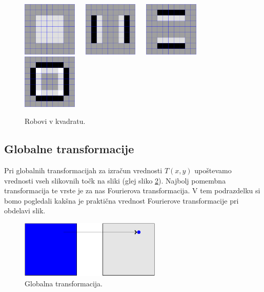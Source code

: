 %
\begin{figure}[htbp]
  \centering
  \includegraphics[width=0.23\textwidth]{./slike-latex/rob-kvadrat}\ \ \ 
  \includegraphics[width=0.23\textwidth]{./slike-latex/rob-kvadrat-vodoravno}\ \ \  
  \includegraphics[width=0.23\textwidth]{./slike-latex/rob-kvadrat-navpicno}\ \ \ 
  \includegraphics[width=0.23\textwidth]{./slike-latex/rob-kvadrat-vod-nav}
  \caption{Robovi v kvadratu.}
  \label{fig:roboviKvadrat}
\end{figure}
%
\subsection{Globalne transformacije}
Pri globalnih transformacijah za izračun vrednosti $T(x, y)$ upoštevamo vrednosti vseh slikovnih točk na sliki (glej sliko \ref{fig:globalnaT}). Najbolj pomembna transformacija te vrste je za nas Fourierova transformacija. V tem podrazdelku si bomo pogledali kakšna je praktična vrednost Fourierove transformacije pri obdelavi slik. 

%
\begin{figure}[htbp]
  \centering
  \includegraphics[width=0.6\textwidth]{./slike-latex/globalnaT}
  \caption{Globalna transformacija.}
  \label{fig:globalnaT}
\end{figure}
%

